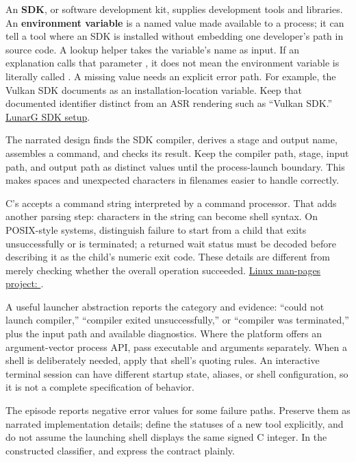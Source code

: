 An \textbf{SDK}, or software development kit, supplies development tools and libraries. An \textbf{environment variable} is a named value made available to a process; it can tell a tool where an SDK is installed without embedding one developer's path in source code. A lookup helper takes the variable's name as input. If an explanation calls that parameter , it does not mean the environment variable is literally called . A missing value needs an explicit error path. For example, the Vulkan SDK documents  as an installation-location variable. Keep that documented identifier distinct from an ASR rendering such as ``Vulkan SDK.'' \href{https://vulkan.lunarg.com/doc/view/latest/linux/getting_started.html}{LunarG SDK setup}.

The narrated design finds the SDK compiler, derives a stage and output name, assembles a command, and checks its result. Keep the compiler path, stage, input path, and output path as distinct values until the process-launch boundary. This makes spaces and unexpected characters in filenames easier to handle correctly.

C's  accepts a command string interpreted by a command processor. That adds another parsing step: characters in the string can become shell syntax. On POSIX-style systems, distinguish failure to start from a child that exits unsuccessfully or is terminated; a returned wait status must be decoded before describing it as the child's numeric exit code. These details are different from merely checking whether the overall operation succeeded. \href{https://man7.org/linux/man-pages/man3/system.3.html}{Linux man-pages project: }.

A useful launcher abstraction reports the category and evidence: ``could not launch compiler,'' ``compiler exited unsuccessfully,'' or ``compiler was terminated,'' plus the input path and available diagnostics. Where the platform offers an argument-vector process API, pass executable and arguments separately. When a shell is deliberately needed, apply that shell's quoting rules. An interactive terminal session can have different startup state, aliases, or shell configuration, so it is not a complete specification of  behavior.

The episode reports negative error values for some failure paths. Preserve them as narrated implementation details; define the statuses of a new tool explicitly, and do not assume the launching shell displays the same signed C integer. In the constructed classifier,  and  express the contract plainly.

